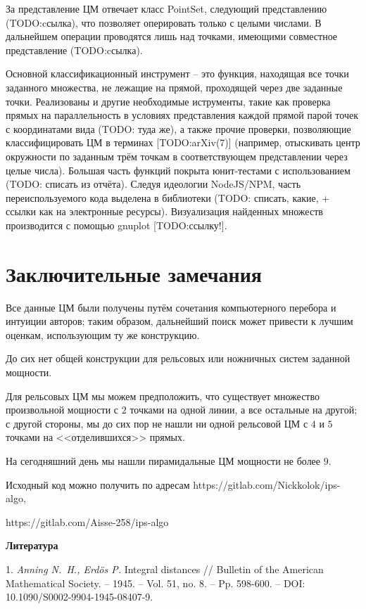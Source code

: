 \documentclass[12pt]{article}
\theoremstyle{theorem}
\theoremstyle{dfn}
\theoremstyle{remark}
\begin{document}
За представление ЦМ отвечает класс PointSet, следующий представлению (TODO:cсылка),
что позволяет оперировать только с целыми числами.
В дальнейшем операции проводятся лишь над точками, имеющими совместное представление (TODO:cсылка).


Основной классификационный инструмент -- это функция, находящая все точки заданного множества, не лежащие на прямой,
проходящей через две заданные точки.
Реализованы и другие необходимые иструменты, такие как проверка прямых на параллельность в условиях представления каждой прямой парой точек
с координатами вида (TODO: туда же),
а также прочие проверки, позволяющие классифицировать ЦМ в терминах [TODO:arXiv(7)]
(например, отыскивать центр окружности по заданным трём точкам в соответствующем представлении через целые числа).
Большая часть функций покрыта юнит-тестами с использованием (TODO: списать из отчёта).
Следуя идеологии NodeJS/NPM, часть переиспользуемого кода выделена в библиотеки (TODO: списать, какие, + ссылки как на электронные ресурсы).
Визуализация найденных множеств производится с помощью gnuplot [TODO:ссылку!].








\section{Заключительные замечания}

Все данные ЦМ были получены путём сочетания компьютерного перебора и интуиции авторов;
таким образом, дальнейший поиск может привести к лучшим оценкам, использующим ту же
конструкцию.

До сих нет общей конструкции для рельсовых или ножничных систем заданной мощности.

Для рельсовых ЦМ мы можем предположить, что существует множество произвольной мощности с $2$ точками на одной линии, а все остальные на другой; с другой стороны,
мы до сих пор не нашли ни одной рельсовой ЦМ с $4$ и $5$ точками на <<отделившихся>> прямых.

На сегодняшний день мы нашли пирамидальные ЦМ мощности не более $9$.

Исходный код можно получить по адресам https://gitlab.com/Nickkolok/ips-algo,

https://gitlab.com/Aisse-258/ips-algo

\bigskip\centerline{\bf Литература}

1.	\emph{ Anning N.~H., Erd{\"o}s P.} Integral distances // Bulletin of the American Mathematical Society. -- 1945. -- Vol. 51, no. 8. -- Pp. 598-600. -- DOI: 10.1090/S0002-9904-1945-08407-9.
\end{document}
